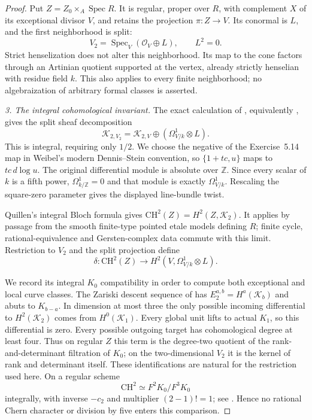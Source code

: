 \begin{proof}
Put $Z=Z_0\times_A\operatorname{Spec}R$. It is regular,
proper over $R$, with complement $X$ of its exceptional
divisor $V$, and retains the projection $\pi:Z\to V$.
Its conormal is $L$, and the first neighborhood is split:
\[
          V_2=\operatorname{Spec}_V(\mathcal O_V\oplus L),
                            \qquad L^2=0.
                                                        \tag{C.3an.7}
\]
Strict henselization does not alter this neighborhood.
Its map to the cone factors through an Artinian quotient
supported at the vertex, already strictly henselian with
residue field $k$. This also applies to every finite
neighborhood; no algebraization of arbitrary formal classes
is asserted.

\emph{3. The integral cohomological invariant.}
The exact calculation of
\citet[unnumbered theorem and corollary, p.~A1204]{frVanDerKallen1971},
equivalently \citet[Chapter~III, Exercise~5.14(a)--(c), pp.~46--47]
{frWeibelKbookIII}, gives the split sheaf decomposition
\[
 \mathcal K_{2,V_2}=\mathcal K_{2,V}
                       \oplus(\Omega^1_{V/k}\otimes L).
                                                        \tag{C.3an.8}
\]
This is integral, requiring only $1/2$. We choose the
negative of the Exercise~5.14 map in Weibel's modern
Dennis--Stein convention, so $\{1+tc,u\}$ maps to
$tc\,d\log u$. The original differential module is absolute
over $\mathbb Z$. Since every scalar of $k$ is a fifth
power, $\Omega^1_{k/\mathbb Z}=0$ and that module is exactly
$\Omega^1_{V/k}$. Rescaling the square-zero parameter
gives the displayed line-bundle twist.

Quillen's integral Bloch formula
\citep[Section~7, Theorems~5.11 and~5.19, pp.~133--137]
{rootQuillen1973} gives
$\mathrm{CH}^2(Z)=H^2(Z,\mathcal K_2)$.
It applies by passage from the smooth finite-type pointed
etale models defining $R$; finite cycle, rational-equivalence
and Gersten-complex data commute with this limit.
Restriction to $V_2$ and the split projection define
\[
 \delta:\mathrm{CH}^2(Z)\longrightarrow
                              H^2(V,\Omega^1_{V/k}\otimes L).
                                                        \tag{C.3an.9}
\]

We record its integral $K_0$ compatibility in order to
compute both exceptional and local curve classes.
The Zariski descent sequence of
\citet[Theorem~10.3, pp.~383--386]{D_ThomasonTrobaugh1990}
has $E_2^{a,b}=H^a(\mathcal K_b)$ and abuts to $K_{b-a}$.
In dimension at most three the only possible incoming
differential to $H^2(\mathcal K_2)$ comes from
$H^0(\mathcal K_1)$. Every global unit lifts to actual
$K_1$, so this differential is zero. Every possible
outgoing target has cohomological degree at least four.
Thus on regular $Z$ this term is the degree-two quotient
of the rank-and-determinant filtration of $K_0$; on
the two-dimensional $V_2$ it is the kernel of rank and
determinant itself. These identifications are natural
for the restriction used here. On a regular scheme
\[
 \mathrm{CH}^2\simeq F^2K_0/F^3K_0
\]
integrally, with inverse $-c_2$ and multiplier
$(2-1)!=1$; see \citet[Example~15.3.6, p.~298]{frC4Fulton1998}.
Hence no rational Chern character or division by five
enters this comparison.


\end{proof}

